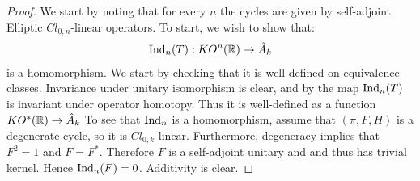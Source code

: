 \begin{proof}
We start by noting that for every $n$ the cycles are given by self-adjoint Elliptic $Cl_{0,n}$-linear operators. 
To start, we wish to show that: 
\begin{align*}
	\operatorname{Ind}_n(T):KO^n(\mathbb{R})\to \hat{A}_k
\end{align*}
is a homomorphism. 
We start by checking that it is well-defined on equivalence classes. Invariance under unitary isomorphism is clear, and by  the map $\operatorname{Ind}_n(T)$ is invariant under operator homotopy. Thus it is well-defined as a function $KO^*(\mathbb{R})\to \hat{A}_k$
To see that $\operatorname{Ind}_n$ is a homomorphism, assume that $(\pi,F,H)$ is a degenerate cycle, so it is $Cl_{0,k}$-linear. Furthermore, degeneracy implies that $F^2=1$ and $F=F^*$. Therefore $F$ is a self-adjoint unitary and and thus has trivial kernel. Hence $\operatorname{Ind}_n(F)=0$. 
Additivity is clear. 


\end{proof}
